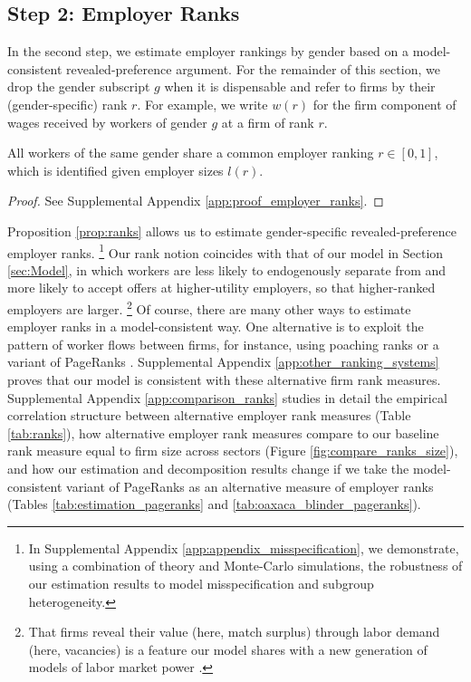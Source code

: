 \subsection{Step 2: Employer Ranks\label{subsec:identification_ranks}}

In the second step, we estimate employer rankings by gender based on a model-consistent revealed-preference argument. For the remainder of this section, we drop the gender subscript $g$ when it is dispensable and refer to firms by their (gender-specific) rank $r$. For example, we write $w(r)$ for the firm component of wages received by workers of gender $g$ at a firm of rank $r$.
%
\newcommand{\PropRanks}{%
    All workers of the same gender share a common employer ranking $r \in [0,1]$, which is identified given employer sizes $l(r)$.%
}
%
\begin{proposition}
    \label{prop:ranks}
    \PropRanks
\end{proposition}
%
\begin{proof}
    See Supplemental Appendix \ref{app:proof_employer_ranks}.
\end{proof}
%

Proposition \ref{prop:ranks} allows us to estimate gender-specific revealed-preference employer ranks.%
%
\footnote{\label{revision_2:editor_comment_8}In Supplemental Appendix \ref{app:appendix_misspecification}, we demonstrate, using a combination of theory and Monte-Carlo simulations, the robustness of our estimation results to model misspecification and subgroup heterogeneity.} %
%
Our rank notion coincides with that of our model in Section \ref{sec:Model}, in which workers are less likely to endogenously separate from and more likely to accept offers at higher-utility employers, so that higher-ranked employers are larger.%
%
\footnote{That firms reveal their value (here, match surplus) through labor demand (here, vacancies) is a feature our model shares with a new generation of models of labor market power \citep{LamadonMogstadSetzler2022, BergerHerkenhoffMongey2022, Felix2022, Sharma2023}.} %
%
Of course, there are many other ways to estimate employer ranks in a model-consistent way. One alternative is to exploit the pattern of worker flows between firms, for instance, using poaching ranks \citep{BaggerLentz2019} or a variant of PageRanks \citep{PageBrinMotwaniWinograd1999}. Supplemental Appendix \ref{app:other_ranking_systems} proves that our model is consistent with these alternative firm rank measures. %
%
\label{revision_2:editor_comment_1}Supplemental Appendix \ref{app:comparison_ranks} studies in detail the empirical correlation structure between alternative employer rank measures (Table \ref{tab:ranks}), how alternative employer rank measures compare to our baseline rank measure equal to firm size across sectors (Figure \ref{fig:compare_ranks_size}), and how our estimation and decomposition results change if we take the model-consistent variant of PageRanks as an alternative measure of employer ranks (Tables \ref{tab:estimation_pageranks} and \ref{tab:oaxaca_blinder_pageranks}).


